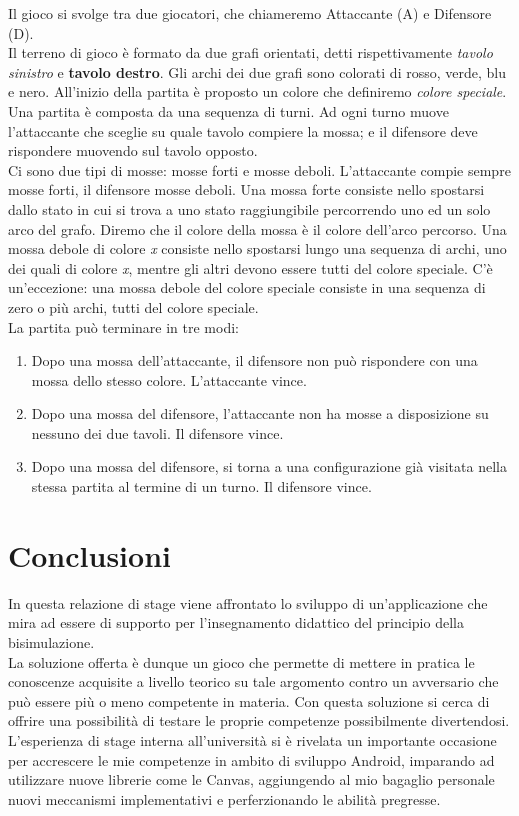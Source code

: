 \documentclass[a4paper,11pt,twoside,openright]{report}
\begin{document}
Il gioco si svolge tra due giocatori, che chiameremo Attaccante (A) e Difensore (D).\\
Il terreno di gioco è formato da due grafi orientati, detti rispettivamente \textit{tavolo sinistro} e \textbf{tavolo destro}. Gli archi dei due grafi sono colorati di rosso, verde, blu e nero. All'inizio della
partita è proposto un colore che definiremo \textit{colore speciale}.\\
Una partita è composta da una sequenza di turni. Ad ogni turno muove l’attaccante che sceglie su quale tavolo compiere la mossa; e il difensore deve rispondere muovendo sul tavolo opposto.\\
Ci sono due tipi di mosse: mosse forti e mosse deboli. L’attaccante compie sempre mosse forti, il difensore mosse deboli. Una mossa forte consiste nello spostarsi dallo stato in cui si trova a uno stato raggiungibile percorrendo uno ed un solo arco del grafo. Diremo che il colore della mossa è il colore dell’arco percorso. Una mossa debole di colore \textit{x} consiste nello spostarsi lungo una sequenza di archi, uno dei quali di colore \textit{x}, mentre gli altri devono essere tutti del colore speciale. C'è un’eccezione: una mossa debole del colore speciale consiste in una sequenza di zero o più archi, tutti del colore speciale.\\
La partita può terminare in tre modi:

\begin{enumerate}
\item Dopo una mossa dell’attaccante, il difensore non può rispondere con una mossa dello stesso colore. L’attaccante vince.

\item Dopo una mossa del difensore, l’attaccante non ha mosse a disposizione su nessuno dei due tavoli. Il difensore vince.

\item Dopo una mossa del difensore, si torna a una configurazione già visitata nella stessa partita al termine di un turno. Il difensore vince.
\end{enumerate}

\chapter{Conclusioni}
In questa relazione di stage viene affrontato lo sviluppo di un'applicazione che mira ad essere di supporto per l'insegnamento didattico del principio della bisimulazione.\\
La soluzione offerta è dunque un gioco che permette di mettere in pratica le conoscenze acquisite a livello teorico su tale argomento contro un avversario che può essere più o meno competente in materia. Con questa soluzione si cerca di offrire una possibilità di testare le proprie competenze possibilmente divertendosi.\\
L'esperienza di stage interna all'università si è rivelata un importante occasione per accrescere le mie competenze in ambito di sviluppo Android, imparando ad utilizzare nuove librerie come le Canvas, aggiungendo al mio bagaglio personale nuovi meccanismi implementativi e perferzionando le abilità pregresse.
\end{document}
